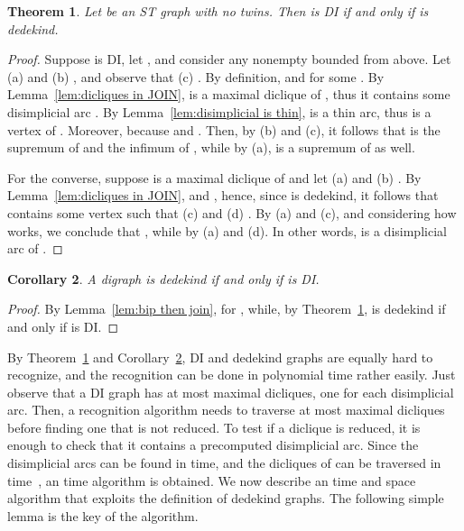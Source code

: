 \documentclass[a4paper,11pt]{article}
\newtheorem{theorem}{Theorem}
\newtheorem{corollary}[theorem]{Corollary}
\begin{document}
\begin{theorem}\label{thm:DI characterization}
 Let  be an ST graph with no twins.  Then  is DI if and only if\/  is dedekind.
\end{theorem}

\begin{proof}
  Suppose  is DI, let , and consider any nonempty  bounded from above.  Let (a)  and (b) , and observe that (c) .  By definition,  and  for some  .  By Lemma~\ref{lem:dicliques in JOIN},  is a maximal diclique of , thus it contains some disimplicial arc .  By Lemma~\ref{lem:disimplicial is thin},  is a thin arc, thus  is a vertex of .  Moreover,  because  and .  Then, by (b) and (c), it follows that  is the supremum of  and the infimum of , while by (a),  is a supremum of  as well.
 
  For the converse, suppose  is a maximal diclique of  and let (a)  and (b) .  By Lemma~\ref{lem:dicliques in JOIN},  and , hence, since  is dedekind, it follows that  contains some vertex  such that (c)  and (d) .  By (a) and (c), and considering how  works, we conclude that , while  by (a) and (d).  In other words,  is a disimplicial arc of . 
\end{proof}

\begin{corollary}\label{cor:dedekind characterization}
  A digraph  is dedekind if and only if\/  is DI.
\end{corollary}

\begin{proof}
  By Lemma~\ref{lem:bip then join},  for , while, by Theorem~\ref{thm:DI characterization},  is dedekind if and only if  is DI.  
\end{proof}

By Theorem~\ref{thm:DI characterization} and Corollary~\ref{cor:dedekind characterization}, DI and dedekind graphs are equally hard to recognize, and the recognition can be done in polynomial time rather easily.  Just observe that a DI graph has at most  maximal dicliques, one for each disimplicial arc.  Then, a recognition algorithm needs to traverse at most  maximal dicliques before finding one that is not reduced.  To test if a diclique is reduced, it is enough to check that it contains a precomputed disimplicial arc.  Since the disimplicial arcs can be found in  time, and the  dicliques of can be traversed in  time~\cite{DiasFigueiredoSzwarcfiterDAM2007}, an  time algorithm is obtained.  We now describe an  time and  space algorithm that exploits the definition of dedekind graphs.  The following simple lemma is the key of the algorithm.
\end{document}
